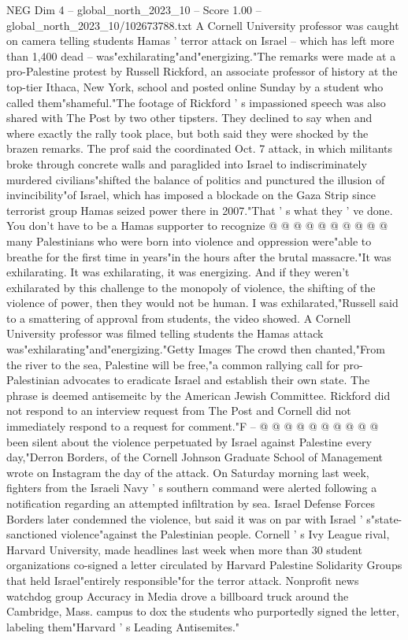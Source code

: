 \begin{textsample}{NEG Dim 4 – global\_north\_2023\_10 – Score 1.00 – global\_north\_2023\_10/102673788.txt}  \label{ex:f4_neg_009}
A Cornell University professor was caught on camera telling students Hamas ' terror attack on Israel -- which has left more than 1,400 dead -- was"exhilarating"and"energizing."The remarks were made at a pro-Palestine protest by Russell Rickford, an associate professor of history at the top-tier Ithaca, New York, school and posted online Sunday by a student who called them"shameful."The footage of Rickford ' s impassioned speech was also shared with The Post by two other tipsters.
They declined to say when and where exactly the rally took place, but both said they were shocked by the brazen remarks.
The prof said the coordinated Oct. 7 attack, in which militants broke through concrete walls and paraglided into Israel to indiscriminately murdered civilians"shifted the balance of politics and punctured the illusion of invincibility"of Israel, which has imposed a blockade on the Gaza Strip since terrorist group Hamas seized power there in 2007."That ' s what they ' ve done.
You don't have to be a Hamas supporter to recognize @ @ @ @ @ @ @ @ @ @ many Palestinians who were born into violence and oppression were"able to breathe for the first time in years"in the hours after the brutal massacre."It was exhilarating.
It was exhilarating, it was energizing.
And if they weren't exhilarated by this challenge to the monopoly of violence, the shifting of the violence of power, then they would not be human.
I was exhilarated,"Russell said to a smattering of approval from students, the video showed.
A Cornell University professor was filmed telling students the Hamas attack was"exhilarating"and"energizing."Getty Images The crowd then chanted,"From the river to the sea, Palestine will be free,"a common rallying call for pro-Palestinian advocates to eradicate Israel and establish their own state.
The phrase is deemed antisemeitc by the American Jewish Committee.
Rickford did not respond to an interview request from The Post and Cornell did not immediately respond to a request for comment."F -- @ @ @ @ @ @ @ @ @ @ been silent about the violence perpetuated by Israel against Palestine every day,"Derron Borders, of the Cornell Johnson Graduate School of Management wrote on Instagram the day of the attack.
On Saturday morning last week, fighters from the Israeli Navy ' s southern command were alerted following a notification regarding an attempted infiltration by sea.
Israel Defense Forces Borders later condemned the violence, but said it was on par with Israel ' s"state-sanctioned violence"against the Palestinian people.
Cornell ' s Ivy League rival, Harvard University, made headlines last week when more than 30 student organizations co-signed a letter circulated by Harvard Palestine Solidarity Groups that held Israel"entirely responsible"for the terror attack.
Nonprofit news watchdog group Accuracy in Media drove a billboard truck around the Cambridge, Mass. campus to dox the students who purportedly signed the letter, labeling them"Harvard ' s Leading Antisemites."

\end{textsample}

